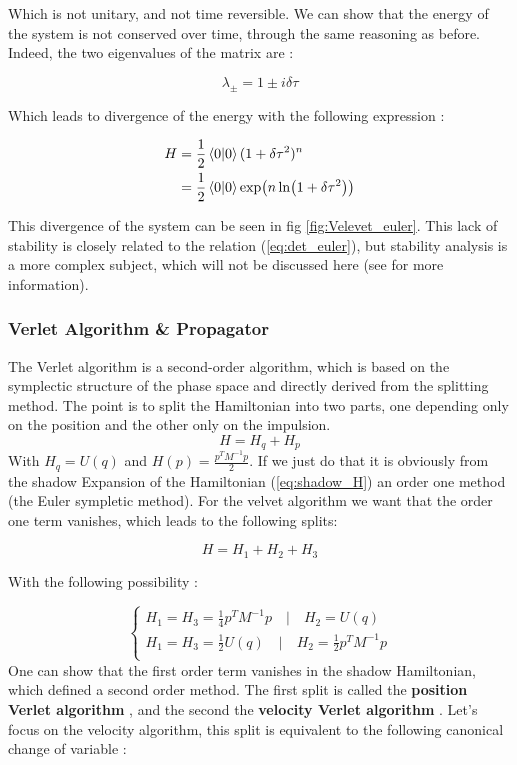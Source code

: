 \documentclass[ansiapaper]{report}
\begin{document}
\begin{multicols}{3}
	Which is not unitary, and not time reversible. We can show that the energy of the system is not conserved over time, through the same reasoning as before. Indeed, the two eigenvalues of the matrix are :

	$$ \lambda_\pm = 1 \pm i \delta \tau$$

	Which leads to divergence of the energy with the following expression :

	\begin{align*}
		H & = \frac{1}{2}\braket{0}{0}(1 + \delta \tau^2)^n          \\
		  & = \frac{1}{2}\braket{0}{0}\exp(n \ln(1 + \delta \tau^2))
		\\
	\end{align*}

    This divergence of the system can be seen in fig \ref{fig:Velevet_euler}. This lack of stability is closely related to the relation (\ref{eq:det_euler}), but stability analysis is a more complex subject, which will not be discussed here (see \cite{MD_theo} for more information).

	\subsubsection{Verlet Algorithm \& Propagator}

    The Verlet algorithm is a second-order algorithm, which is based on the symplectic structure of the phase space and directly derived from the splitting method. The point is to split the Hamiltonian into two parts, one depending only on the position and the other only on the impulsion. $$H = H_q + H_p$$ With $H_q = U(q)$ and $H(p) = \frac{p^TM^{-1}p}{2}$. If we just do that it is obviously from the shadow Expansion of the Hamiltonian (\ref{eq:shadow_H}) an order one method (the Euler sympletic method). For the velvet algorithm we want that the order one term vanishes, which leads to the following splits:

	$$H = H_1 + H_2 + H_3$$

	With the following possibility :

	$$\begin{cases*}
			H_1 = H_3 = \frac{1}{4}p^TM^{-1}p \quad|\quad H_2 = U(q)             \\
			H_1 = H_3 = \frac{1}{2}U(q) \quad|\quad  H_2 = \frac{1}{2}p^TM^{-1}p \\
		\end{cases*}
	$$
	One can show that the first order term vanishes in the shadow Hamiltonian, which defined a second order method. The first split is called the \textbf{position Verlet algorithm} , and the second the \textbf{velocity Verlet algorithm} . Let's focus on the velocity algorithm, this split is equivalent to the following canonical change of variable :


\end{multicols}
\end{document}
